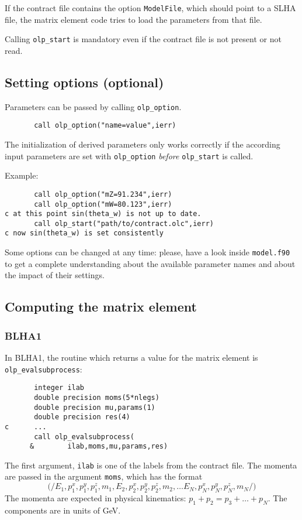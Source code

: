If the contract file contains the option
\texttt{ModelFile}, which should point to a SLHA file,
the matrix element code tries to load the parameters from that file.

\attention Calling \texttt{olp\_start} is mandatory even if the contract
file is not present or not read.

\subsection{Setting options (optional)}
Parameters can be passed by calling \texttt{olp\_option}.
\begin{lstlisting}
       call olp_option("name=value",ierr)
\end{lstlisting}

\attention The initialization of derived parameters only works correctly
if the according input parameters are set with \texttt{olp\_option}
\emph{before} \texttt{olp\_start} is called.

Example:
\begin{lstlisting}
       call olp_option("mZ=91.234",ierr)
       call olp_option("mW=80.123",ierr)
c at this point sin(theta_w) is not up to date.
       call olp_start("path/to/contract.olc",ierr)
c now sin(theta_w) is set consistently
\end{lstlisting}

Some options can be changed at any time: please, have a look inside
\texttt{model.f90} to get a complete understanding about the available
parameter names and about the impact of their settings.

\subsection{Computing the matrix element}

\subsubsection{BLHA1}

In BLHA1, the routine which returns a value for the matrix element is
\texttt{olp\_evalsubprocess}:
\begin{lstlisting}
       integer ilab
       double precision moms(5*nlegs)
       double precision mu,params(1)
       double precision res(4)
c      ...
       call olp_evalsubprocess(
      &        ilab,moms,mu,params,res)
\end{lstlisting}

The first argument, \texttt{ilab} is one of the labels from the
contract file. The momenta are passed in the argument \texttt{moms},
which has the format
\begin{displaymath}
\mathtt{(/}
E_1, p^x_1, p^y_1, p^z_1, m_1,
E_2, p^x_2, p^y_2, p^z_2, m_2, \ldots
E_N, p^x_N, p^y_N, p^z_N, m_N
\mathtt{/)}
\end{displaymath}
The momenta are expected in physical kinematics: $p_1+p_2=p_3+\ldots+p_N$.
The components are in units of GeV.

